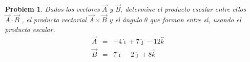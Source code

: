\documentclass{article}
\newtheorem{problem}[theorem]{Problem}
\begin{document}
\begin{problem}
Dados los vectores $\vec{A}$ y $\vec{B}$, determine el producto escalar
entre ellos $\vec{A}\cdot \vec{B}$ , el producto vectorial $\vec{A}\times 
\vec{B}$ y el \'{a}ngulo $\theta $ que forman entre s\'{\i}, usando el
producto escalar.%
\begin{eqnarray*}
\vec{A} &=&-4\hat{\imath}+7\hat{\jmath}-12\hat{k} \\
\vec{B} &=&7\hat{\imath}-2\hat{\jmath}+8\hat{k}
\end{eqnarray*}
\end{problem}
\end{document}
